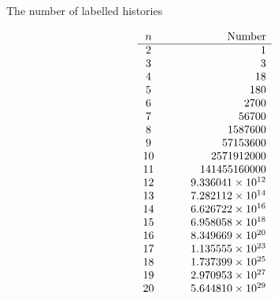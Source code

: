 \documentclass[bluish,slideColor,colorBG,pdf]{prosper}
\begin{document}
\begin{slide}[Replace]{The number of labelled histories}
\vspace{-0.27in}

\begin{center}
\[
\begin{array}{ c c r}
  n   &  &   {\rm Number} \\
\hline
  2  &  \ \ \ \ &      1 \\
3  &  &  3 \\
4  &  &  18 \\
5  &  &  180 \\
6  &  &  2700 \\
7  &  &  56700 \\
8  &  &  1587600 \\
9  &  &  57153600 \\
10  & &  2571912000 \\
11  & &  141455160000 \\
12  & &  9.336041\times 10^{12} \\
13  & &  7.282112\times 10^{14} \\
14  & &  6.626722\times 10^{16} \\
15  & &  6.958058\times 10^{18} \\
16  & &  8.349669\times 10^{20} \\
17  & &  1.135555\times 10^{23} \\
18  & &  1.737399\times 10^{25} \\
19  & &  2.970953\times 10^{27} \\
20  & &  5.644810\times 10^{29} \\
\end{array}
\]
\end{center}

\end{slide}
\end{document}

